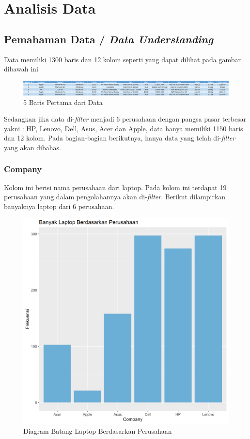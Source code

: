 \documentclass[12pt]{article}
\begin{document}
\section{Analisis Data}
\subsection{Pemahaman Data / \textit{Data Understanding}}
Data memiliki 1300 baris dan 12 kolom seperti yang dapat dilihat pada gambar dibawah ini  
  
\begin{figure}[h!]  
    \centering
    \includegraphics[scale = 0.4]{GambaR Tbale.png}
    \caption{5 Baris Pertama dari Data}
    \label{First}
\end{figure}  
  
Sedangkan jika data di-\textit{filter} menjadi 6 perusahaan dengan pangsa pasar terbesar yakni : HP, Lenovo, Dell, Asus, Acer dan Apple, data hanya memiliki 1150 baris dan 12 kolom. Pada bagian-bagian berikutnya, hanya data yang telah di-\textit{filter} yang akan dibahas.
\subsubsection{Company}
Kolom ini berisi nama perusahaan dari laptop. Pada kolom ini terdapat 19 perusahaan yang dalam pengolahannya akan di-\textit{filter}. Berikut dilampirkan banyaknya laptop dari 6 perusahaan.
\begin{figure}[h!]
    \centering
    \includegraphics[scale = 0.4]{barplot0.png}
    \caption{Diagram Batang Laptop Berdasarkan Perusahaan}
    \label{ahay}
\end{figure}
\end{document}
